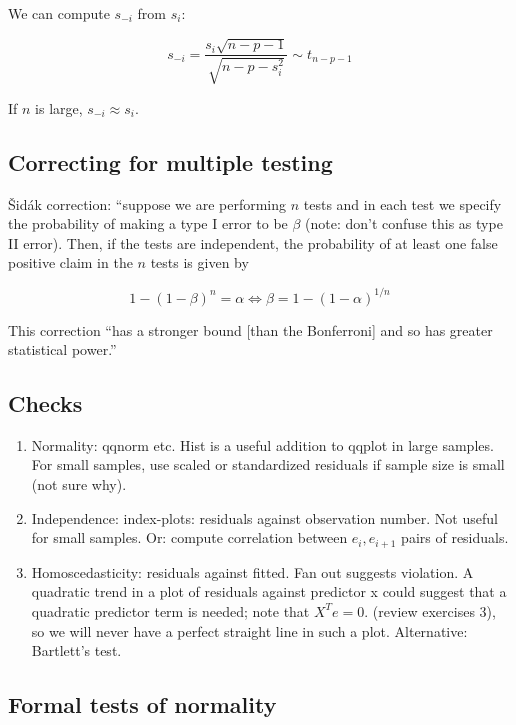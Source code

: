 We can compute $s_{-i}$ from $s_{i}$:

\begin{equation}
s_{-i} = \frac{s_i \sqrt{n-p-1}}{\sqrt{n-p-s_{i}^2}} \sim t_{n-p-1}
\end{equation}

If $n$ is large, $s_{-i}\approx s_i$. 

\subsection{Correcting for multiple testing}

\v{S}id\'ak correction: 
``suppose we are performing $n$ tests and in each test we specify the probability of making a type I error to be $\beta$ (note: don't confuse this as type II error). Then, if the tests are independent, the probability of at least one false positive claim in the $n$ tests is given by 

\begin{equation}
1-(1-\beta)^n = \alpha \Leftrightarrow \beta = 1-(1-\alpha)^{1/n}
\end{equation}

This correction ``has a stronger bound [than the Bonferroni] and so has greater statistical power.''

\subsection{Checks}

\begin{enumerate}
\item Normality: qqnorm etc. Hist is a useful addition to qqplot in large samples. For small samples, use scaled or standardized residuals if sample size is small (not sure why).
\item Independence: index-plots: residuals against observation number. Not useful for small samples. Or: compute correlation between $e_i, e_{i+1}$ pairs of residuals.
\item Homoscedasticity: residuals against fitted. Fan out suggests violation. A quadratic trend in a plot of residuals against predictor x could suggest that a quadratic predictor term is needed; note that $X^T e = 0$. (review exercises 3), so we will never have a perfect straight line in such a plot. Alternative: Bartlett's test.
\end{enumerate}

\subsection{Formal tests of normality}

